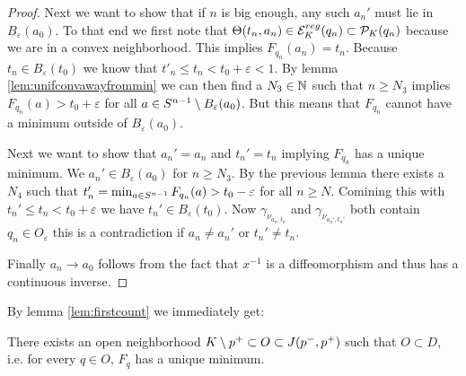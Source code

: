 \begin{proof}
    Next we want to show that if $n$ is big enough, any such $a_n'$ must lie in $B_\varepsilon(a_0)$. To that end we first note that  $\Theta(t_n,a_n)\in {{\mathcal{E}}^{reg}_K}(q_n)\subset {\mathcal{P}}_K(q_n)$ because we are in a convex neighborhood. This implies $F_{q_n}(a_n)=t_n$. Because $t_n\in B_\varepsilon(t_0)$ we know that $t'_n\leq t_n < t_0+\varepsilon < 1$. By lemma \ref{lem:unifconvawayfrommin} we can then find a $N_3\in \mathbb{N}$ such that $n\ge N_3$ implies $F_{q_n}(a)>t_0+\varepsilon$ for all $a\in {S^{n-1}} \setminus B_\varepsilon(a_0)$. But this means that $F_{q_n}$ cannot have a minimum outside of $B_\varepsilon(a_0)$.

    Next we want to show that $a_n'=a_n$ and $t_n'=t_n$ implying $F_{q_n}$ has a unique minimum.
    We $a_n'\in B_\varepsilon(a_0)$ for $n\ge N_3$. By the previous lemma there exists a $N_4$ such that $t'_n=\min_{a\in {S^{n-1}}} F_{q_n}(a) > t_0-\varepsilon$ for all $n\ge N$. Comining this with $t_n'\leq t_n < t_0+\varepsilon$ we have $t_n'\in B_\varepsilon(t_0)$. Now $\gamma_{\nu_{a_n,t_n}}$ and $\gamma_{\nu_{a_n',t_n'}}$ both contain $q_n\in O_\varepsilon$ this is a contradiction if $a_n\neq a_n'$ or $t_n'\neq t_n$. 

    Finally $a_n\to a_0$ follows from the fact that $x^{-1}$ is a diffeomorphism and thus has a continuous inverse.
\end{proof}

By lemma \ref{lem:firstcount} we immediately get:
\begin{corollary}
    There exists an open neighborhood $K\setminus p^+\subset O\subset J(p^-,p^+)$ such that $O\subset D$, i.e. for every $q\in O$, $F_q$ has a unique minimum.
\end{corollary}

